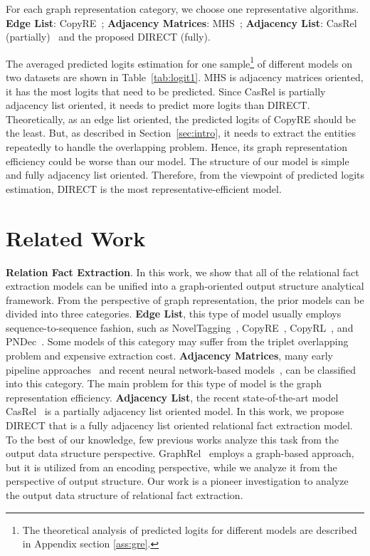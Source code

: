 \documentclass[11pt,a4paper]{article}
\begin{document}
For each graph representation category, we choose one representative  algorithms. \textbf{Edge List}: CopyRE~\cite{zeng2018extracting}; \textbf{Adjacency Matrices}: MHS~\cite{bekoulis2018joint}; \textbf{Adjacency List}: CasRel (partially)~\cite{wei2020novel} and the proposed DIRECT (fully).

The averaged predicted logits estimation for one sample\footnote{The theoretical analysis of predicted logits for different models are described in Appendix section \ref{ass:gre}.} of different models on two datasets are shown in Table~\ref{tab:logit1}. MHS is adjacency matrices oriented, it has the most logits that need to be predicted. Since CasRel is partially adjacency list oriented, it needs to predict more logits than DIRECT. Theoretically, as an edge list oriented, the predicted logits of CopyRE should be the least. But, as described in Section~\ref{sec:intro}, it needs to extract the entities repeatedly to handle the overlapping problem. Hence, its graph representation efficiency could be worse than our model. The structure of our model is simple and fully adjacency list oriented. Therefore, from the viewpoint of predicted logits estimation, DIRECT is the most representative-efficient model. \section{Related Work}\label{review}
\textbf{Relation Fact Extraction}. In this work, we show that all of the relational fact extraction models can be unified into a graph-oriented output structure analytical framework. From the perspective of graph representation, the prior models can be divided into three categories.
\textbf{Edge List}, this type of model usually employs sequence-to-sequence fashion, such as NovelTagging~\cite{zheng2017joint}, CopyRE~\cite{zeng2018extracting}, CopyRL~\cite{zeng2019learning}, and PNDec~\cite{nayak2020effective}. Some models of this category may suffer from the triplet overlapping problem and expensive extraction cost. \textbf{Adjacency Matrices}, many early pipeline approaches~\cite{zelenko2003kernel,zhou2005exploring,mintz2009distant} and recent neural network-based models~\cite{bekoulis2018joint,dai2019joint,fu2019graphrel}, can be classified into this category. The main problem for this type of model is the graph representation efficiency. \textbf{Adjacency List}, the recent state-of-the-art model CasRel~\cite{wei2020novel} is a partially adjacency list oriented model. In this work, we propose DIRECT that is a fully adjacency list oriented relational fact extraction model. To the best of our knowledge, few previous works analyze this task from the output data structure perspective. GraphRel~\cite{fu2019graphrel} employs a graph-based approach, but it is utilized from an encoding perspective, while we analyze it from the perspective of output structure. Our work is a pioneer investigation to analyze the output data structure of relational fact extraction.
\end{document}

